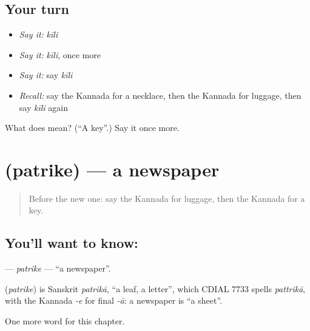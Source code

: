 \subsection*{Your turn}
\begin{itemize}
\raggedright
  \item \emph{Say it:} \emph{kīli}
  \item \emph{Say it:} \emph{kīli}, once more
  \item \emph{Say it:} say \emph{kīli}
  \item \emph{Recall:} say the Kannada for a necklace, then the Kannada for luggage, then say \emph{kīli} again
\end{itemize}

\begin{tcolorbox}[breakable,colback=teal!4,colframe=teal!35!black,title={Before you move on}]
What does  mean? (\textquotedblleft{}A key\textquotedblright{}.) Say it once more.
\end{tcolorbox}
\section[\texorpdfstring{\kn{ಪತ್ರಿಕೆ} (patrike)}{ಪತ್ರಿಕೆ (patrike)}]{ (patrike) — a newspaper}

\label{lesson:KA-C260-patrike}



\begin{quote}
Before the new one: say the Kannada for luggage, then the Kannada for a key.
\end{quote}

\subsection*{You'll want to know: }
\textbf{} — \emph{patrike} — \textquotedblleft{}a newspaper\textquotedblright{}.

\begin{cousinweb}
\textbf{} (\emph{patrike}) is Sanskrit \emph{patrikā}, \textquotedblleft{}a leaf, a letter\textquotedblright{}, which CDIAL 7733 spells \emph{pattrikā}, with the Kannada \emph{-e} for final \emph{-ā}: a newspaper is \textquotedblleft{}a sheet\textquotedblright{}.
\end{cousinweb}

\begin{grammarlens}[title={What you've built}]
One more word for this chapter.
\end{grammarlens}

